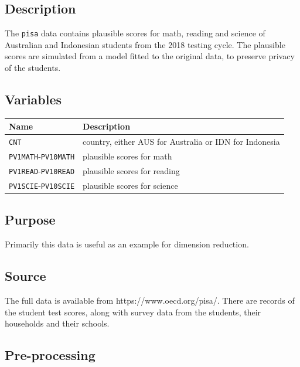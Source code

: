\documentclass[
  letterpaper,
]{krantz}
\begin{document}
\subsection*{Description}\label{description-4}

The \texttt{pisa} data contains plausible scores for math, reading and
science of Australian and Indonesian students from the 2018 testing
cycle. The plausible scores are simulated from a model fitted to the
original data, to preserve privacy of the students.

\subsection*{Variables}\label{variables-4}

\begin{longtable}[]{@{}ll@{}}
\toprule\noalign{}
Name & Description \\
\midrule\noalign{}
\endhead
\bottomrule\noalign{}
\endlastfoot
\texttt{CNT} & country, either AUS for Australia or IDN for Indonesia \\
\texttt{PV1MATH}-\texttt{PV10MATH} & plausible scores for math \\
\texttt{PV1READ}-\texttt{PV10READ} & plausible scores for reading \\
\texttt{PV1SCIE}-\texttt{PV10SCIE} & plausible scores for science \\
\end{longtable}

\subsection*{Purpose}\label{purpose-4}

Primarily this data is useful as an example for dimension reduction.

\subsection*{Source}\label{source-4}

The full data is available from https://www.oecd.org/pisa/. There are
records of the student test scores, along with survey data from the
students, their households and their schools.

\subsection*{Pre-processing}\label{pre-processing-4}
\end{document}

